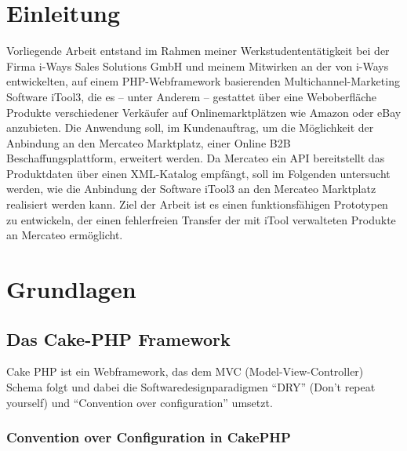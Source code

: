 

\section{Einleitung}
\vspace*{\fill}
\begin{center}
\begin{minipage}{.6\textwidth}

Vorliegende Arbeit entstand im Rahmen meiner Werkstudententätigkeit bei der Firma i-Ways Sales Solutions GmbH und meinem Mitwirken
an der von i-Ways entwickelten, auf einem PHP-Webframework basierenden Multichannel-Marketing Software iTool3, die es -- unter Anderem -- gestattet über eine Weboberfläche Produkte verschiedener
Verkäufer auf Onlinemarktplätzen wie Amazon oder eBay anzubieten.
Die Anwendung soll, im Kundenauftrag, um die Möglichkeit der Anbindung an den Mercateo Marktplatz, einer Online B2B Beschaffungsplattform, erweitert werden.
Da Mercateo ein API bereitstellt das Produktdaten über einen XML-Katalog empfängt, soll im Folgenden untersucht werden, wie die Anbindung der Software iTool3 an den Mercateo Marktplatz realisiert werden kann. Ziel der Arbeit ist es einen funktionsfähigen Prototypen zu entwickeln, der einen fehlerfreien Transfer der mit iTool verwalteten Produkte an Mercateo ermöglicht.
\end{minipage}
\end{center}
\vfill %
\clearpage

\pagebreak

\section{Grundlagen}

\subsection{Das Cake-PHP Framework}
	
	Cake PHP ist ein Webframework, das dem MVC (Model-View-Controller) Schema folgt und dabei die Softwaredesignparadigmen \enquote{DRY} (Don't repeat yourself) und \enquote{Convention over configuration} umsetzt. 
	
	\subsubsection{Convention over Configuration in CakePHP}
	

